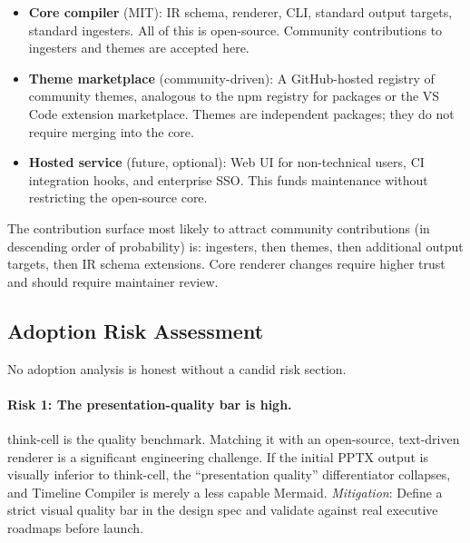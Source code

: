 \begin{itemize}
  \item \textbf{Core compiler} (MIT): IR schema, renderer, CLI, standard
        output targets, standard ingesters.
        All of this is open-source.
        Community contributions to ingesters and themes are accepted here.

  \item \textbf{Theme marketplace} (community-driven):
        A GitHub-hosted registry of community themes, analogous to the
        npm registry for packages or the VS Code extension marketplace.
        Themes are independent packages; they do not require merging into
        the core.

  \item \textbf{Hosted service} (future, optional):
        Web UI for non-technical users, CI integration hooks,
        and enterprise SSO.
        This funds maintenance without restricting the open-source core.
\end{itemize}

\noindent
The contribution surface most likely to attract community contributions
(in descending order of probability) is: ingesters, then themes, then
additional output targets, then IR schema extensions.
Core renderer changes require higher trust and should require maintainer
review.

\subsection{Adoption Risk Assessment}
\label{sec:oss-risk}

No adoption analysis is honest without a candid risk section.

\paragraph{Risk 1: The presentation-quality bar is high.}
think-cell is the quality benchmark.
Matching it with an open-source, text-driven renderer is a significant
engineering challenge.
If the initial PPTX output is visually inferior to think-cell, the
``presentation quality'' differentiator collapses, and Timeline Compiler
is merely a less capable Mermaid.
\textit{Mitigation}: Define a strict visual quality bar in the design
spec and validate against real executive roadmaps before launch.

